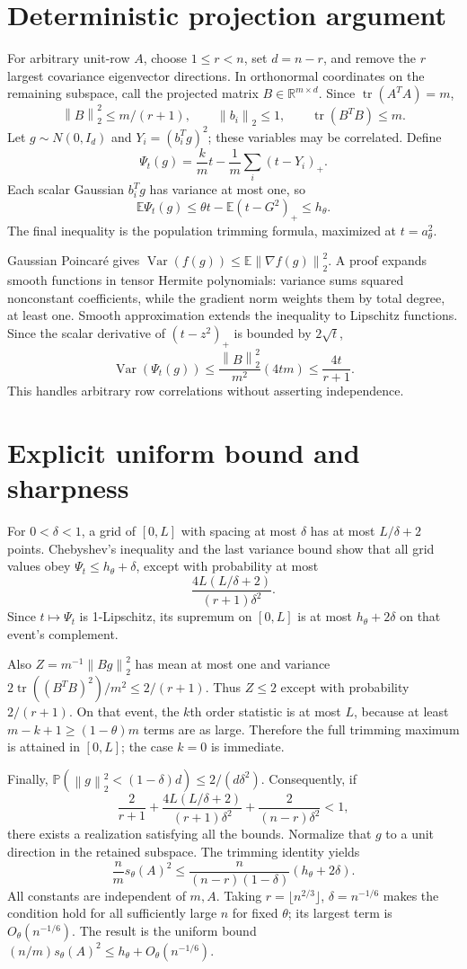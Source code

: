 \documentclass[11pt]{article}
\newcommand{\R}{\mathbb R}
\newcommand{\norm}[1]{\left\lVert#1\right\rVert}
\newcommand{\E}{\mathbb E}
\newcommand{\Prob}{\mathbb P}
\newcommand{\tr}{\operatorname{tr}}
\begin{document}
\section{Deterministic projection argument}
For arbitrary unit-row $A$, choose $1\le r<n$, set $d=n-r$, and remove the $r$ largest covariance eigenvector directions. In orthonormal coordinates on the remaining subspace, call the projected matrix $B\in\R^{m\times d}$. Since $\tr(A^TA)=m$,
\[
\norm B_2^2\le m/(r+1),\qquad\norm{b_i}_2\le1,\qquad\tr(B^TB)\le m.
\]
Let $g\sim N(0,I_d)$ and $Y_i=(b_i^Tg)^2$; these variables may be correlated. Define
\[\Psi_t(g)=\frac km t-\frac1m\sum_i(t-Y_i)_+.\]
Each scalar Gaussian $b_i^Tg$ has variance at most one, so
\[
\E\Psi_t(g)\le\theta t-\E(t-G^2)_+\le h_\theta.
\]
The final inequality is the population trimming formula, maximized at $t=a_\theta^2$.

Gaussian Poincar\'e gives $\operatorname{Var}(f(g))\le\E\norm{\nabla f(g)}_2^2$. A proof expands smooth functions in tensor Hermite polynomials: variance sums squared nonconstant coefficients, while the gradient norm weights them by total degree, at least one. Smooth approximation extends the inequality to Lipschitz functions. Since the scalar derivative of $(t-z^2)_+$ is bounded by $2\sqrt t$,
\[
\operatorname{Var}(\Psi_t(g))\le\frac{\norm B_2^2}{m^2}(4tm)\le\frac{4t}{r+1}.
\]
This handles arbitrary row correlations without asserting independence.
\section{Explicit uniform bound and sharpness}
For $0<\delta<1$, a grid of $[0,L]$ with spacing at most $\delta$ has at most $L/\delta+2$ points. Chebyshev's inequality and the last variance bound show that all grid values obey $\Psi_t\le h_\theta+\delta$, except with probability at most
\[\frac{4L(L/\delta+2)}{(r+1)\delta^2}.\]
Since $t\mapsto\Psi_t$ is 1-Lipschitz, its supremum on $[0,L]$ is at most $h_\theta+2\delta$ on that event's complement.

Also $Z=m^{-1}\norm{Bg}_2^2$ has mean at most one and variance $2\tr((B^TB)^2)/m^2\le2/(r+1)$. Thus $Z\le2$ except with probability $2/(r+1)$. On that event, the $k$th order statistic is at most $L$, because at least $m-k+1\ge(1-\theta)m$ terms are as large. Therefore the full trimming maximum is attained in $[0,L]$; the case $k=0$ is immediate.

Finally, $\Prob(\norm g_2^2<(1-\delta)d)\le2/(d\delta^2)$. Consequently, if
\[
\frac2{r+1}+\frac{4L(L/\delta+2)}{(r+1)\delta^2}
+\frac2{(n-r)\delta^2}<1,
\]
there exists a realization satisfying all the bounds. Normalize that $g$ to a unit direction in the retained subspace. The trimming identity yields
\[\boxed{\frac nm s_\theta(A)^2\le\frac{n}{(n-r)(1-\delta)}(h_\theta+2\delta).}\]
All constants are independent of $m,A$. Taking $r=\lfloor n^{2/3}\rfloor$, $\delta=n^{-1/6}$ makes the condition hold for all sufficiently large $n$ for fixed $\theta$; its largest term is $O_\theta(n^{-1/6})$. The result is the uniform bound $(n/m)s_\theta(A)^2\le h_\theta+O_\theta(n^{-1/6})$.
\end{document}
